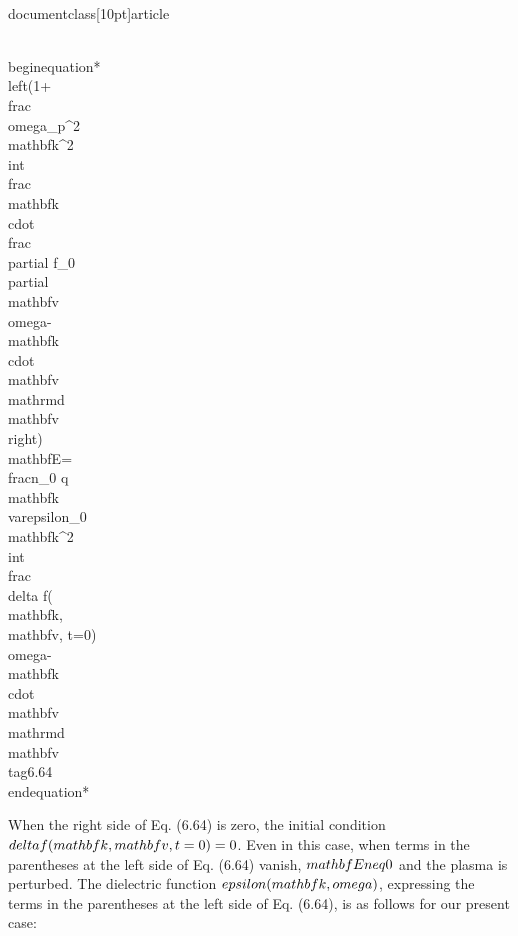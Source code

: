 \\documentclass[10pt]{article}
\begin{document}
{{{{\\begin{equation*}
\\left(1+\\frac{\\omega_{p}^{2}}{\\mathbf{k}^{2}} \\int \\frac{\\mathbf{k} \\cdot \\frac{\\partial f_{0}}{\\partial \\mathbf{v}}}{\\omega-\\mathbf{k} \\cdot \\mathbf{v}} \\mathrm{d} \\mathbf{v}\\right) \\mathbf{E}=\\frac{n_{0} q \\mathbf{k}}{\\varepsilon_{0} \\mathbf{k}^{2}} \\int \\frac{\\delta f(\\mathbf{k}, \\mathbf{v}, t=0)}{\\omega-\\mathbf{k} \\cdot \\mathbf{v}} \\mathrm{d} \\mathbf{v} \\tag{6.64}
\\end{equation*}


When the right side of Eq. (6.64) is zero, the initial condition $\\delta f(\\mathbf{k}, \\mathbf{v}, t=0)=0$. Even in this case, when terms in the parentheses at the left side of Eq. (6.64) vanish, $\\mathbf{E} \\neq 0$ and the plasma is perturbed. The dielectric function $\\epsilon(\\mathbf{k}, \\omega)$, expressing the terms in the parentheses at the left side of Eq. (6.64), is as follows for our present case:


}}}}
\end{document}

